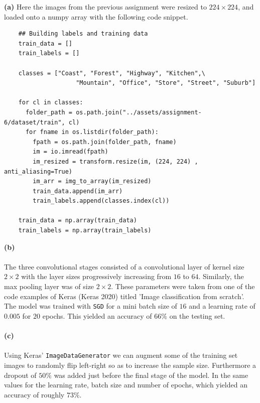 \begin{homeworkProblem}
  \textbf{(a)}
  Here the images from the previous assignment were resized to $224\times224$,
  and loaded onto a numpy array with the following code snippet.

  \begin{verbatim}
    ## Building labels and training data
    train_data = []
    train_labels = []

    classes = ["Coast", "Forest", "Highway", "Kitchen",\
                    "Mountain", "Office", "Store", "Street", "Suburb"]

    for cl in classes:
      folder_path = os.path.join("../assets/assignment-6/dataset/train", cl)
      for fname in os.listdir(folder_path):
        fpath = os.path.join(folder_path, fname)
        im = io.imread(fpath)
        im_resized = transform.resize(im, (224, 224) , anti_aliasing=True)
        im_arr = img_to_array(im_resized)
        train_data.append(im_arr)
        train_labels.append(classes.index(cl))

    train_data = np.array(train_data)
    train_labels = np.array(train_labels)
  \end{verbatim}

\textbf{(b)}
\\
\\

The three convolutional stages consisted of a convolutional layer of kernel
size $2 \times 2$ with the layer sizes progressively increasing from $16$ to
$64$. Similarly, the max pooling layer was of size $2 \times 2$. These parameters
were taken from one of the code examples of Keras (Keras 2020) titled
'Image classification from scratch'. The model was trained with
\texttt{SGD}
for a mini batch size of $16$ and a learning rate of $0.005$ for $20$ epochs.
This yielded an accuracy of $66\%$ on the testing set. \\ \\

\textbf{(c)}
\\
\\

Using Keras' \texttt{ImageDataGenerator} we can augment some
of the training set images to randomly flip left-right so as to increase the
sample size. Furthermore a dropout of $50\%$ was added just before the final
stage of the model. In the same values for the learning rate, batch size and
number of epochs, which yielded an accuracy of roughly $73\%$. \\ \\


\end{homeworkProblem}
